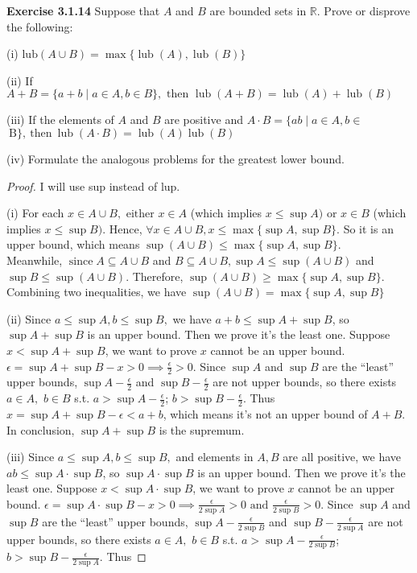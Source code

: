 \documentclass[12pt]{article}
\theoremstyle{definition}
\numberwithin{equation}{subsection}
\begin{document}
\textbf{Exercise 3.1.14} Suppose that $A$ and $B$ are bounded sets in $\mathbb{R} .$ Prove or
disprove the following:

(i) $\text{lub} (A \cup B)=\max \{\operatorname{lub}(A), \operatorname{lub}(B)\} $

(ii) If $A+B=\{a+b \mid a \in A, b \in B\}, \text { then } \operatorname{lub}(A+B)=\operatorname{lub}(A)+ \operatorname{lub}(B) $

(iii) If the elements of $A$ and $B$ are positive and $A \cdot B=\{a b \mid a \in A, b \in$
$\mathrm{~ B \} , ~ t h e n ~} \operatorname{lub}(A \cdot B)=\operatorname{lub}(A) \operatorname{lub}(B)$

(iv) Formulate the analogous problems for the greatest lower bound.
\begin{proof}
    I will use sup instead of lup.

(i) For each \(x \in A \cup B, \text { either } x \in A \) (which implies \( x \leq \sup A) \text { or } x \in B \) (which implies \( x \leq \sup B)\). Hence, $\forall x \in A \cup B, x \leq \max\{\sup A,\sup B\}$. So it is an upper bound, which means $\sup (A \cup B) \leq \max \{\sup A, \sup B\}$.
\\Meanwhile, \(\operatorname{since} A \subseteq A \cup B\) and \(B \subseteq A \cup B, \sup A \leq \sup (A \cup B)\) and \(\sup B \leq \sup (A \cup B)\). Therefore, \(\sup (A \cup B) \geq \max \{\sup A, \sup B\}\).
\\Combining two inequalities, we have \(\sup (A \cup B) = \max \{\sup A, \sup B\}\)

(ii) Since \(a \leq \sup A, b \leq \sup B,\) we have \(a+b \leq \sup A +\sup B\), so $\sup A +\sup B$ is an upper bound. Then we prove it's the least one. Suppose $x < \sup A +\sup B$, we want to prove $x$ cannot be an upper bound. $\epsilon = \sup A +\sup B - x > 0 \implies \frac{\epsilon}{2} > 0$. Since $\sup A$ and $\sup B$ are the ``least'' upper bounds, $\sup A - \frac{\epsilon}{2}$ and $\sup B - \frac{\epsilon}{2}$ are not upper bounds, so there exists $a \in A,$ $b \in B$ s.t. $a > \sup A - \frac{\epsilon}{2}$; $b > \sup B - \frac{\epsilon}{2}$. Thus $x = \sup A + \sup B - \epsilon < a + b$, which means it's not an upper bound of $A+B$. In conclusion, $\sup A +\sup B$ is the supremum.

(iii) Since
\(a \leq \sup A, b \leq \sup B,\)
and elements in $A, B$ are all positive,
we have \(ab \leq \sup A \cdot \sup B\), so $\sup A \cdot\sup B$ is an upper bound. Then we prove it's the least one.
Suppose $x < \sup A \cdot\sup B$, we want to prove $x$ cannot be an upper bound. $\epsilon = \sup A \cdot\sup B - x > 0 \implies \frac{\epsilon}{2\sup A} > 0 \text{ and } \frac{\epsilon}{2\sup B} > 0$. Since $\sup A$ and $\sup B$ are the ``least'' upper bounds,
$\sup A - \frac{\epsilon}{2\sup B}$ and $\sup B - \frac{\epsilon}{2\sup A}$ are not upper bounds, so there exists $a \in A,$ $b \in B$ s.t. $a > \sup A - \frac{\epsilon}{2\sup B}$; $b > \sup B - \frac{\epsilon}{2\sup A}$. Thus


\end{proof}
\end{document}
